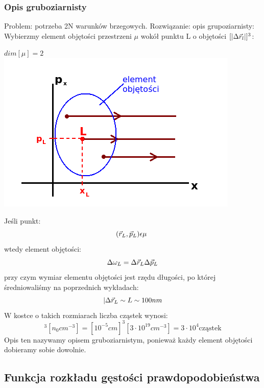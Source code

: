 \subsubsection{Opis gruboziarnisty}
Problem: potrzeba 2N warunków brzegowych.
Rozwiązanie: opis grupoziarnisty:\\
Wybierzmy element objętości przestrzeni $\mu$ wokół punktu L o objętości $[|\Delta \vec{r}_l|]^3$:
\begin{center}$dim[\mu]=2$\\
\includegraphics[scale=0.75] {obrazki/przestrzen_fazowa2.png}
\end{center}
Jeśli punkt:
\begin{equation} (\vec{r}_L,\vec{p}_L)\epsilon\mu~ \nonumber \end{equation}
wtedy element objętości:
\begin{equation}\Delta\omega_L=\Delta\vec{r}_L\Delta\vec{p}_L\end{equation}
przy czym wymiar elementu objętości jest rzędu długości, po której średniowaliśmy na poprzednich wykładach:
\begin{equation}|\Delta\vec{r}_L\sim L\sim 100nm\end{equation}
W kostce o takich rozmiarach liczba cząstek wynosi:
\begin{equation}[|\Delta\r_L|]^3[n_0 cm^{-3}]=[10^{-5}cm]^3[3\cdot10^{19}cm^{-3}]=3\cdot 10^4 \text{cząstek}\nonumber\end{equation}
Opis ten nazywamy opisem gruboziarnistym, ponieważ każdy element objętości dobieramy sobie dowolnie.

\subsection{Funkcja rozkładu gęstości prawdopodobieństwa}

